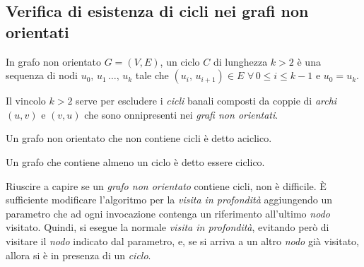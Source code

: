 \subsection{Verifica di esistenza di cicli nei grafi non orientati}
\begin{definition}
    In grafo non orientato $G=(V,E)$, un ciclo $C$ di lunghezza $k>2$ è una
    sequenza di nodi $u_0,\,u_1\,\dots,\,u_k$ tale che $(u_i,\,u_{i+1})\in E$
    $\forall\,0\leq i\leq k-1$ e $u_0=u_k$.
\end{definition}
\begin{note}
    Il vincolo $k>2$ serve per escludere i \emph{cicli} banali composti da
    coppie di \emph{archi} $(u,v)$ e $(v,u)$ che sono onnipresenti nei
    \emph{grafi non orientati}.
\end{note}

\begin{definition}
    Un grafo non orientato che non contiene cicli è detto aciclico.
\end{definition}
\begin{definition}
    Un grafo che contiene almeno un ciclo è detto essere ciclico.
\end{definition}\noindent
Riuscire a capire se un \emph{grafo non orientato} contiene cicli, non è
difficile. È sufficiente modificare l'algoritmo per la \emph{visita in
profondità} aggiungendo un parametro che ad ogni invocazione contenga un
riferimento all'ultimo \emph{nodo} visitato. Quindi, si esegue la normale
\emph{visita in profondità}, evitando però di visitare il \emph{nodo} indicato
dal parametro, e, se si arriva a un altro \emph{nodo} già visitato, allora si è
in presenza di un \emph{ciclo}.

